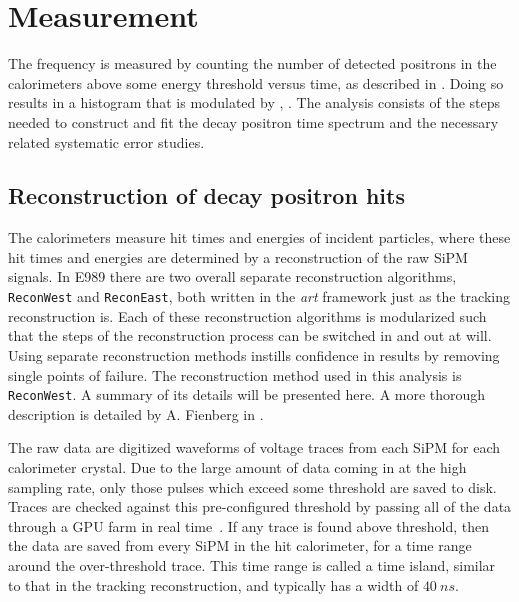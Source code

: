 
\thispagestyle{myheadings}

\graphicspath{{Body/Figures/Wa/Reconstruction/}{Body/Figures/Wa/Histogramming/}{Body/Figures/Wa/Pileup/}{Body/Figures/Wa/Pileup/TimeAndEnergySpectra/}{Body/Figures/Wa/Pileup/Scaling/}{Body/Figures/Wa/RatioAnalysis/}{Body/Figures/Wa/RatioAnalysis/MethodOverview/}{Body/Figures/Wa/RatioAnalysis/VW_Studies/}{Body/Figures/Wa/Datasets/Endgame/LostMuonFiles/MainCuts/}{Body/Figures/Wa/Datasets/ComparisonPlots/LostMuons/}{Body/Figures/Wa/Datasets/60h/SingleIteration/SingleFits/}{Body/Figures/Wa/Datasets/9d/EnergyThreshold/}{Body/Figures/Wa/Datasets/60h/NoTimeRand/}}

\chapter{\texorpdfstring{\wa}{wa} Measurement}
\label{chapter:wa}


The \gmtwo frequency \wa is measured by counting the number of detected positrons in the calorimeters above some energy threshold versus time, as described in . Doing so results in a histogram that is modulated by \wa, . The \wa analysis consists of the steps needed to construct and fit the decay positron time spectrum and the necessary related systematic error studies.


\section{Reconstruction of decay positron hits}
\label{sec:ReconWest}


The calorimeters measure hit times and energies of incident particles, where these hit times and energies are determined by a reconstruction of the raw SiPM signals. In E989 there are two overall separate reconstruction algorithms, \texttt{ReconWest} and \texttt{ReconEast}, both written in the \textit{art} framework just as the tracking reconstruction is. Each of these reconstruction algorithms is modularized such that the steps of the reconstruction process can be switched in and out at will. Using separate reconstruction methods instills confidence in results by removing single points of failure. The reconstruction method used in this analysis is \texttt{ReconWest}. A summary of its details will be presented here. A more thorough description is detailed by A. Fienberg in .


The raw data are digitized waveforms of voltage traces from each SiPM for each calorimeter crystal. Due to the large amount of data coming in at the high sampling rate, only those pulses which exceed some threshold are saved to disk. Traces are checked against this pre-configured threshold by passing all of the data through a GPU farm in real time~\cite{Gohn:2016shi}. If any trace is found above threshold, then the data are saved from every SiPM in the hit calorimeter, for a time range around the over-threshold trace. This time range is called a time island, similar to that in the tracking reconstruction, and typically has a width of $\SI{40}{ns}$.


